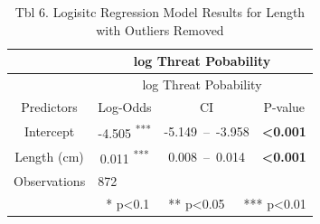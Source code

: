 \documentclass[
  letterpaper,
  DIV=11,
  numbers=noendperiod]{scrartcl}
\begin{document}
\begin{longtable}[]{@{}cccc@{}}
\caption{Tbl 6. Logisitc Regression Model Results for Length with
Outliers Removed}\tabularnewline
\toprule()
~ & \multicolumn{3}{c}{log Threat Pobability} \\
\midrule()
\endfirsthead
\toprule()
~ & \multicolumn{3}{c}{log Threat Pobability} \\
\midrule()
\endhead
Predictors & Log-Odds & CI & P-value \\
Intercept & -4.505 \textsuperscript{***} & -5.149~--~-3.958 &
\textbf{\textless0.001} \\
Length (cm) & 0.011 \textsuperscript{***} & 0.008~--~0.014 &
\textbf{\textless0.001} \\
Observations & \multicolumn{3}{l}{872} \\
\multicolumn{4}{r}{* p\textless0.1~~~** p\textless0.05~~~***
p\textless0.01} \\
\bottomrule()
\end{longtable}
\end{document}

